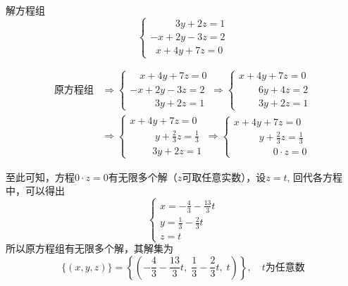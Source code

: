 \begin{example}
    解方程组
    \[\begin{cases}
     \qquad \;\; 3y+2z=1\\-x+2y-3z=2\\\;\; x+4y+7z=0 
    \end{cases}\]
\end{example}

\begin{solution}
    \[\begin{split}
    \text{原方程组}& \Rightarrow \begin{cases}
      \quad   x+4y+7z=0\\-x+2y-3z=2\\\qquad \;\;3y+2z=1
    \end{cases} \Rightarrow \begin{cases}
        x+4y+7z=0\\\qquad  6y+4z=2\\\qquad  3y+2z=1
    \end{cases}\\
    &\Rightarrow \begin{cases}
        x+4y+7z=0\\\qquad \;\; y+\frac{2}{3}z=\frac{1}{3}\\\qquad \;3y+2z=1 
    \end{cases}\Rightarrow \begin{cases}
        x+4y+7z=0\\\qquad \;\;y+\frac{2}{3}z=\frac{1}{3}\\\qquad \qquad  0\cdot z=0
    \end{cases}
    \end{split}\]
    
    至此可知，方程$0\cdot z=0$有无限多个解（$z$可取任意实数），设$z=t$, 回代各方程中，可以得出
    \[\begin{cases}
        x=-\frac{4}{3}-\frac{13}{3}t\\
        y=\frac{1}{3}-\frac{2}{3}t\\
        z=t
    \end{cases}\]
   所以原方程组有无限多个解，其解集为
    \[\{ (x,y, z) \} = \left\{ \left(-\frac{4}{3}-\frac{13}{3}t,\; \frac{1}{3}-\frac{2}{3}t,\; t\right) \right\}, \quad t\text{为任意数}\]
 \end{solution}
    
